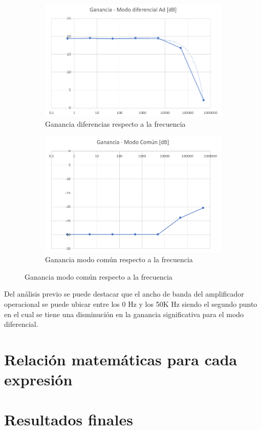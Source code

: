 \begin{figure}[h]
	\begin{subfigure}[b]{0.5\linewidth}
		\centering
		\includegraphics[width=\linewidth]{media/grafica-advsf}
		\caption{Ganancia diferencias respecto a la frecuencia}
		\label{fig:grafica-advsf}
	\end{subfigure}
	\hfill
	\begin{subfigure}[b]{0.5\linewidth}
		\centering
		\includegraphics[width=\linewidth]{media/grafica-acvsf}
		\caption{Ganancia modo común respecto a la frecuencia}
		\label{fig:grafica-acvsf}
	\end{subfigure}	
\end{figure}

Del análisis previo se puede destacar que el ancho de banda del amplificador operacional se puede ubicar entre los 0 Hz y los 50K Hz siendo el segundo punto en el cual se tiene una disminución en la ganancia significativa para el modo diferencial.

\section{Relación matemáticas para cada expresión}


\section*{Resultados finales}



